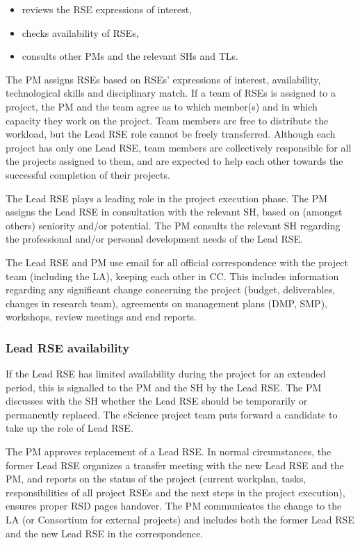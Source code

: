 \begin{itemize}
\item reviews the RSE expressions of interest,
\item checks availability of RSEs,
\item consults other PMs and the relevant SHs and TLs.
\end{itemize}

The PM assigns RSEs based on RSEs' expressions of interest, availability, technological skills and
disciplinary match. If a team of RSEs is assigned to a project, the PM and the team agree as to which member(s) and in
which capacity they work on the project. Team members are free to distribute the workload, but the Lead RSE role cannot
be freely transferred. Although each project has only one Lead RSE, team members are collectively responsible for all
the projects assigned to them, and are expected to help each other towards the successful completion of their
projects.

The Lead RSE plays a leading role in the project execution phase. The PM assigns the Lead RSE in consultation with the
relevant SH, based on (amongst others) seniority and/or potential. The PM consults the relevant SH regarding the
professional and/or personal development needs of the Lead RSE.

The Lead RSE and PM use email for all official correspondence with the project team (including the LA), keeping each
other in CC. This includes information regarding any significant change concerning the project (budget, deliverables,
changes in research team), agreements on management plans (DMP, SMP), workshops, review meetings and end reports.

\subsubsection{Lead RSE availability}
If the Lead RSE has limited availability during the project for an extended period, this is signalled to the PM and the
SH by the Lead RSE. The PM discusses with the SH whether the Lead RSE should be temporarily or permanently replaced.
The eScience project team puts forward a candidate to take up the role of Lead RSE.

The PM approves replacement of a Lead RSE. In normal circumstances, the former Lead RSE organizes a transfer meeting
with the new Lead RSE and the PM, and reports on the status of the project (current workplan, tasks, responsibilities
of all project RSEs and the next steps in the project execution), ensures proper RSD pages handover. The PM
communicates the change to the LA (or Consortium for external projects) and includes both the former Lead RSE and the
new Lead RSE in the correspondence.

